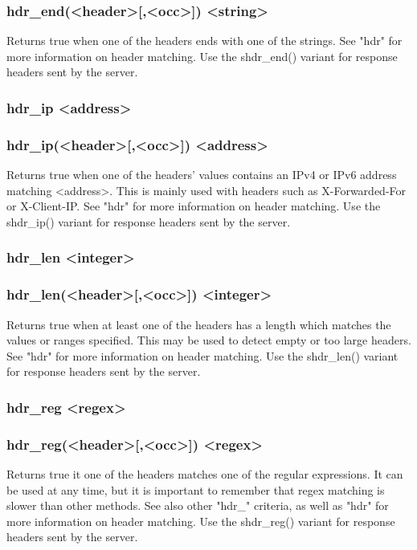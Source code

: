 \subsubsection*{hdr\_end(<header>[,<occ>]) <string>}
  Returns true when one of the headers ends with one of the strings. See "hdr"
  for more information on header matching. Use the shdr\_end() variant for
  response headers sent by the server.

\subsubsection[hdr\_ip]{hdr\_ip <address>}
\subsubsection*{hdr\_ip(<header>[,<occ>]) <address>}
  Returns true when one of the headers' values contains an IPv4 or IPv6 address
  matching <address>. This is mainly used with headers such as X-Forwarded-For
  or X-Client-IP. See "hdr" for more information on header matching. Use the
  shdr\_ip() variant for response headers sent by the server.

\subsubsection[hdr\_len]{hdr\_len <integer>}
\subsubsection*{hdr\_len(<header>[,<occ>]) <integer>}
  Returns true when at least one of the headers has a length which matches the
  values or ranges specified. This may be used to detect empty or too large
  headers. See "hdr" for more information on header matching. Use the
  shdr\_len() variant for response headers sent by the server.

\subsubsection[hdr\_reg]{hdr\_reg <regex>}
\subsubsection*{hdr\_reg(<header>[,<occ>]) <regex>}
  Returns true it one of the headers matches one of the regular expressions. It
  can be used at any time, but it is important to remember that regex matching
  is slower than other methods. See also other "hdr\_" criteria, as well as
  "hdr" for more information on header matching. Use the shdr\_reg() variant for
  response headers sent by the server.

